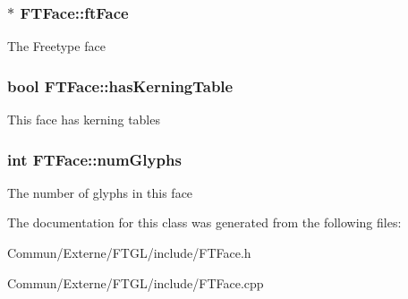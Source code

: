 \subsubsection[{\texorpdfstring{ft\+Face}{ftFace}}]{$\ast$ F\+T\+Face\+::ft\+Face\hspace{0.3cm}{\ttfamily [private]}}\hypertarget{class_f_t_face_a3b9db3f71041db6d43c5f38801926039}{}\label{class_f_t_face_a3b9db3f71041db6d43c5f38801926039}
The Freetype face 
\subsubsection[{\texorpdfstring{has\+Kerning\+Table}{hasKerningTable}}]{\setlength{\rightskip}{0pt plus 5cm}bool F\+T\+Face\+::has\+Kerning\+Table\hspace{0.3cm}{\ttfamily [private]}}\hypertarget{class_f_t_face_a317a8c7187844488e8ea1caacc6b639d}{}\label{class_f_t_face_a317a8c7187844488e8ea1caacc6b639d}
This face has kerning tables 
\subsubsection[{\texorpdfstring{num\+Glyphs}{numGlyphs}}]{\setlength{\rightskip}{0pt plus 5cm}int F\+T\+Face\+::num\+Glyphs\hspace{0.3cm}{\ttfamily [private]}}\hypertarget{class_f_t_face_a07bd69c12d97cfed0f19d8f42deb9f31}{}\label{class_f_t_face_a07bd69c12d97cfed0f19d8f42deb9f31}
The number of glyphs in this face 

The documentation for this class was generated from the following files\+:\begin{DoxyCompactItemize}
\item 
Commun/\+Externe/\+F\+T\+G\+L/include/F\+T\+Face.\+h\item 
Commun/\+Externe/\+F\+T\+G\+L/include/F\+T\+Face.\+cpp\end{DoxyCompactItemize}
